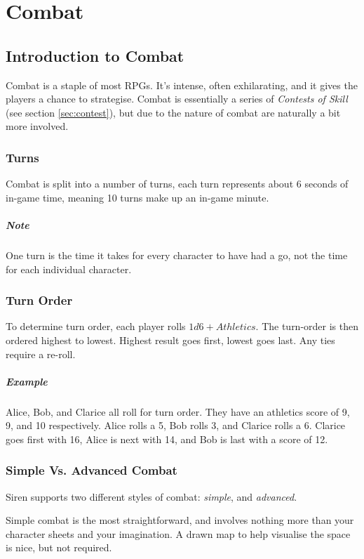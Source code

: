 \chapter{Combat}
\section{Introduction to Combat}
Combat is a staple of most RPGs. 
It's intense, often exhilarating, and it gives the players a chance to strategise. Combat is essentially a series of \textit{Contests of Skill} (see section \ref{sec:contest}), but due to the nature of combat are naturally a bit more involved.
\subsection{Turns}
Combat is split into a number of turns, each turn represents about 6 seconds of in-game time, meaning 10 turns make up an in-game minute.

\paragraph{Note} One turn is the time it takes for every character to have had a go, not the time for each individual character.
\subsection{Turn Order}
To determine turn order, each player rolls $1d6+Athletics$. The turn-order is then ordered highest to lowest. Highest result goes first, lowest goes last. Any ties require a re-roll.

\paragraph{Example} Alice, Bob, and Clarice all roll for turn order. They have an athletics score of 9, 9, and 10 respectively. Alice rolls a 5, Bob rolls 3, and Clarice rolls a 6. Clarice goes first with 16, Alice is next with 14, and Bob is last with a score of 12.

\subsection{Simple Vs. Advanced Combat}
Siren supports two different styles of combat: \textit{simple}, and \textit{advanced}.

Simple combat is the most straightforward, and involves nothing more than your character sheets and your imagination. A drawn map to help visualise the space is nice, but not required.

